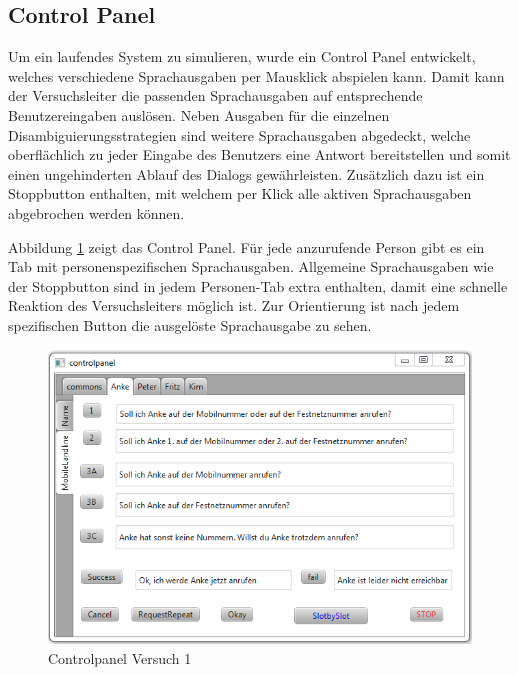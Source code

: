 \documentclass[12pt,a4paper]{scrartcl}
\begin{document}
\subsection{Control Panel}
\label{ControlPanel}
Um ein laufendes System zu simulieren, wurde ein Control Panel entwickelt, welches verschiedene Sprachausgaben per Mausklick abspielen kann. Damit kann der Versuchsleiter die passenden Sprachausgaben auf entsprechende Benutzereingaben auslösen. Neben Ausgaben für die einzelnen Disambiguierungsstrategien sind weitere Sprachausgaben abgedeckt, welche oberflächlich zu jeder Eingabe des Benutzers eine Antwort bereitstellen und somit einen ungehinderten Ablauf des Dialogs gewährleisten. Zusätzlich dazu ist ein Stoppbutton enthalten, mit welchem per Klick alle aktiven Sprachausgaben abgebrochen werden können. 

Abbildung \ref{cp1} zeigt das Control Panel. Für jede anzurufende Person gibt es ein Tab mit personenspezifischen Sprachausgaben. Allgemeine Sprachausgaben wie der Stoppbutton sind in jedem Personen-Tab extra enthalten, damit eine schnelle Reaktion des Versuchsleiters möglich ist. Zur Orientierung ist nach jedem spezifischen Button die ausgelöste Sprachausgabe zu sehen. 
\begin{figure}[htbp]
\includegraphics[width=13cm]{controlpanel.png}
\caption{Controlpanel Versuch 1}
\label{cp1}
\end{figure}
\end{document}
